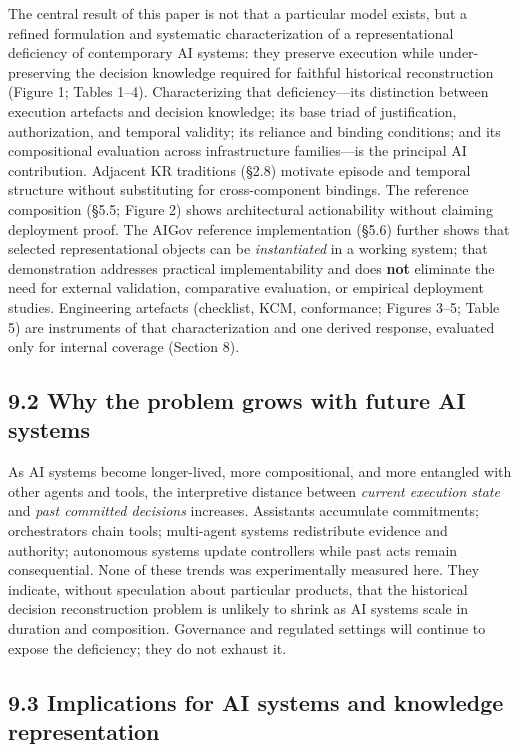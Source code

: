 \documentclass[11pt,a4paper]{article}
\begin{document}
The central result of this paper is not that a particular model exists, but a refined formulation and systematic characterization of a representational deficiency of contemporary AI systems: they preserve execution while under-preserving the decision knowledge required for faithful historical reconstruction (Figure 1; Tables 1--4). Characterizing that deficiency---its distinction between execution artefacts and decision knowledge; its base triad of justification, authorization, and temporal validity; its reliance and binding conditions; and its compositional evaluation across infrastructure families---is the principal AI contribution. Adjacent KR traditions (§2.8) motivate episode and temporal structure without substituting for cross-component bindings. The reference composition (§5.5; Figure 2) shows architectural actionability without claiming deployment proof. The AIGov reference implementation (\S5.6) further shows that selected representational objects can be \emph{instantiated} in a working system; that demonstration addresses practical implementability and does \textbf{not} eliminate the need for external validation, comparative evaluation, or empirical deployment studies. Engineering artefacts (checklist, KCM, conformance; Figures 3--5; Table 5) are instruments of that characterization and one derived response, evaluated only for internal coverage (Section 8).


\subsection{9.2 Why the problem grows with future AI systems}

As AI systems become longer-lived, more compositional, and more entangled with other agents and tools, the interpretive distance between \emph{current execution state} and \emph{past committed decisions} increases. Assistants accumulate commitments; orchestrators chain tools; multi-agent systems redistribute evidence and authority; autonomous systems update controllers while past acts remain consequential. None of these trends was experimentally measured here. They indicate, without speculation about particular products, that the historical decision reconstruction problem is unlikely to shrink as AI systems scale in duration and composition. Governance and regulated settings will continue to expose the deficiency; they do not exhaust it.


\subsection{9.3 Implications for AI systems and knowledge representation}
\end{document}
